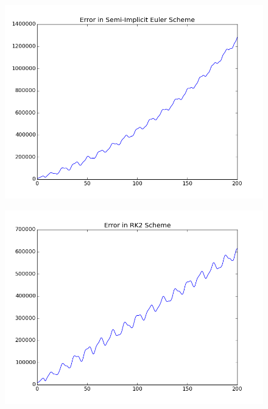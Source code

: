 \documentclass[11pt, a4paper]{article}
\begin{document}
\begin{figure}[H]
 \centering
 \includegraphics[width = \textwidth]{q4_error_euler2.png}
\end{figure}
\begin{figure}[H]
 \centering
 \includegraphics[width = \textwidth]{q4_error_RK2.png}
\end{figure}
\end{document}

